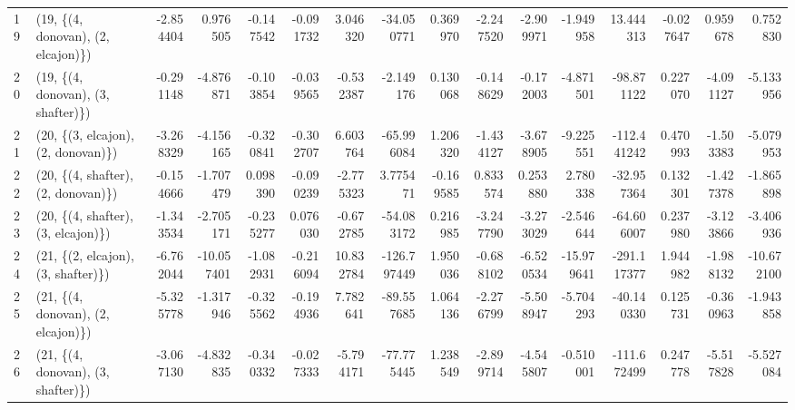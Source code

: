 \begin{tabular}{llrrrrrrrrrrrrrr}
19 &  (19, \{(4, donovan), (2, elcajon)\}) & -2.854404 &   0.976505 &  -0.147542 & -0.091732 &   3.046320 &  -34.050771 &  0.369970 &  -2.247520 & -2.909971 &  -1.949958 &   13.444313 & -0.027647 &  0.959678 &   0.752830 \\
20 &  (19, \{(4, donovan), (3, shafter)\}) & -0.291148 &  -4.876871 &  -0.103854 & -0.039565 &  -0.532387 &   -2.149176 &  0.130068 &  -0.148629 & -0.172003 &  -4.871501 &  -98.871122 &  0.227070 & -4.091127 &  -5.133956 \\
21 &  (20, \{(3, elcajon), (2, donovan)\}) & -3.268329 &  -4.156165 &  -0.320841 & -0.302707 &   6.603764 &  -65.996084 &  1.206320 &  -1.434127 & -3.678905 &  -9.225551 & -112.441242 &  0.470993 & -1.503383 &  -5.079953 \\
22 &  (20, \{(4, shafter), (2, donovan)\}) & -0.154666 &  -1.707479 &   0.098390 & -0.090239 &  -2.775323 &    3.775471 & -0.169585 &   0.833574 &  0.253880 &   2.780338 &  -32.957364 &  0.132301 & -1.427378 &  -1.865898 \\
23 &  (20, \{(4, shafter), (3, elcajon)\}) & -1.343534 &  -2.705171 &  -0.235277 &  0.076030 &  -0.672785 &  -54.083172 &  0.216985 &  -3.247790 & -3.273029 &  -2.546644 &  -64.606007 &  0.237980 & -3.123866 &  -3.406936 \\
24 &  (21, \{(2, elcajon), (3, shafter)\}) & -6.762044 & -10.057401 &  -1.082931 & -0.216094 &  10.832784 & -126.797449 &  1.950036 &  -0.688102 & -6.520534 & -15.979641 & -291.117377 &  1.944982 & -1.988132 & -10.672100 \\
25 &  (21, \{(4, donovan), (2, elcajon)\}) & -5.325778 &  -1.317946 &  -0.325562 & -0.194936 &   7.782641 &  -89.557685 &  1.064136 &  -2.276799 & -5.508947 &  -5.704293 &  -40.140330 &  0.125731 & -0.360963 &  -1.943858 \\
26 &  (21, \{(4, donovan), (3, shafter)\}) & -3.067130 &  -4.832835 &  -0.340332 & -0.027333 &  -5.794171 &  -77.775445 &  1.238549 &  -2.899714 & -4.545807 &  -0.510001 & -111.672499 &  0.247778 & -5.517828 &  -5.527084 \\
\bottomrule
\end{tabular}
